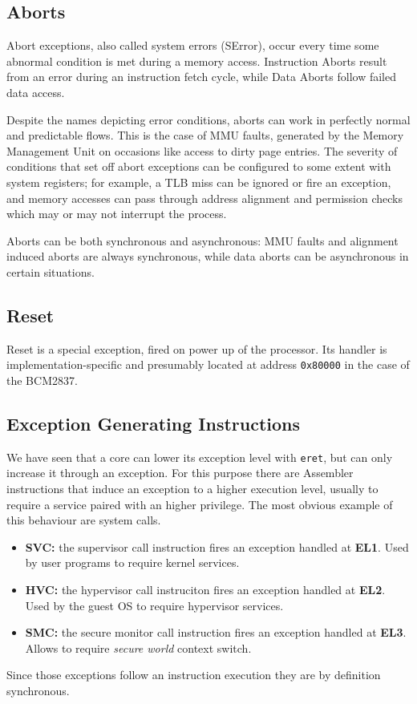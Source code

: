 \documentclass[12pt,a4paper,openright,twoside]{report}
\begin{document}
\subsection{Aborts}
Abort exceptions, also called system errors (SError), occur every time some abnormal
condition is met during a memory access. Instruction Aborts result from an error
during an instruction fetch cycle, while Data Aborts follow failed data access.

Despite the names depicting error conditions, aborts can work in perfectly normal
and predictable flows. This is the case of MMU faults, generated by the Memory
Management Unit on occasions like access to dirty page entries.
The severity of conditions that set off abort exceptions can be configured to 
some extent with system registers; for example, a TLB miss can be ignored or 
fire an exception, and memory accesses can pass through address alignment 
and permission checks which may or may not interrupt the process.

Aborts can be both synchronous and asynchronous: MMU faults and alignment induced 
aborts are always synchronous, while data aborts can be asynchronous in certain
situations.

\subsection{Reset}
Reset is a special exception, fired on power up of the processor. Its handler is 
implementation-specific and presumably located at address {\tt 0x80000} in the 
case of the BCM2837.

\subsection{Exception Generating Instructions}
We have seen that a core can lower its exception level with {\tt eret}, but can
only increase it through an exception. For this purpose there are Assembler instructions
that induce an exception to a higher execution level, usually to require a service 
paired with an higher privilege. The most obvious example of this behaviour are
system calls.
\begin{itemize}
    \item \textbf{SVC:} the supervisor call instruction fires an exception
        handled at \textbf{EL1}. Used by user programs to require kernel services.
    \item \textbf{HVC:} the hypervisor call instruciton fires an exception
        handled at \textbf{EL2}. Used by the guest OS to require hypervisor services.
    \item \textbf{SMC:} the secure monitor call instruction fires an exception
        handled at \textbf{EL3}. Allows to require \textit{secure world} context
        switch.
\end{itemize}
Since those exceptions follow an instruction execution they are by definition
synchronous.
\end{document}
